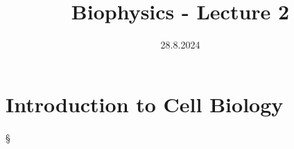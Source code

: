 \documentclass[]{scrartcl}
\title{Biophysics - Lecture 2}
\author{}
\date{28.8.2024}
\begin{document}
\maketitle
\newpage
\tableofcontents
\newpage

\section{Introduction to Cell Biology} 
§
\end{document}
